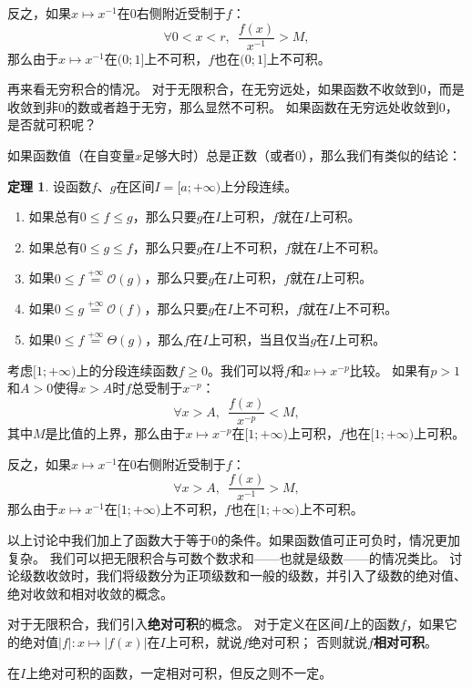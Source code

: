 \documentclass[12pt,UTF8]{ctexbook}
\newcommand{\oveq}[1]{\overset{#1}{=}}   %
\newcommand{\Olim}[1]{\mathcal{O}\left(#1\right)}  %
\newcommand{\Tlim}[1]{\mathcal{\Theta}\left(#1\right)}  %
\theoremstyle{definition}
\newtheorem{tm}{定理}[section]
\theoremstyle{plain}
\begin{document}
反之，如果$x\mapsto x^{-1}$在$0$右侧附近受制于$f$：
$$ \forall 0<x<r ,\,\,\,\frac{f(x)}{x^{-1}} > M,$$
那么由于$x\mapsto x^{-1}$在$(0;1]$上不可积，$f$也在$(0;1]$上不可积。

再来看无穷积合的情况。
对于无限积合，在无穷远处，如果函数不收敛到$0$，而是收敛到非$0$的数或者趋于无穷，那么显然不可积。
如果函数在无穷远处收敛到$0$，是否就可积呢？

如果函数值（在自变量$x$足够大时）总是正数（或者$0$），那么我们有类似的结论：
\begin{tm}
    设函数$f$、$g$在区间$I=[a;+\infty)$上分段连续。
    \begin{enumerate}
        \item 如果总有$0\leqslant f \leqslant g$，那么只要$g$在$I$上可积，$f$就在$I$上可积。
        \item 如果总有$0\leqslant g \leqslant f$，那么只要$g$在$I$上不可积，$f$就在$I$上不可积。
        \item 如果$0\leqslant f \oveq{+\infty} \Olim{g}$，那么只要$g$在$I$上可积，$f$就在$I$上可积。
        \item 如果$0\leqslant g \oveq{+\infty} \Olim{f}$，那么只要$g$在$I$上不可积，$f$就在$I$上不可积。
        \item 如果$0\leqslant f \oveq{+\infty} \Tlim{g}$，那么$f$在$I$上可积，当且仅当$g$在$I$上可积。
    \end{enumerate}
\end{tm}

考虑$[1;+\infty)$上的分段连续函数$f\geqslant 0$。我们可以将$f$和$x\mapsto x^{-p}$比较。
如果有$p>1$和$A>0$使得$x>A$时$f$总受制于$x^{-p}$：
$$ \forall x>A ,\,\,\,\frac{f(x)}{x^{-p}} < M,$$
其中$M$是比值的上界，那么由于$x\mapsto x^{-p}$在$[1;+\infty)$上可积，$f$也在$[1;+\infty)$上可积。

反之，如果$x\mapsto x^{-1}$在$0$右侧附近受制于$f$：
$$ \forall x>A ,\,\,\,\frac{f(x)}{x^{-1}} > M,$$
那么由于$x\mapsto x^{-1}$在$[1;+\infty)$上不可积，$f$也在$[1;+\infty)$上不可积。

以上讨论中我们加上了函数大于等于$0$的条件。如果函数值可正可负时，情况更加复杂。
我们可以把无限积合与可数个数求和——也就是级数——的情况类比。
讨论级数收敛时，我们将级数分为正项级数和一般的级数，并引入了级数的绝对值、绝对收敛和相对收敛的概念。

对于无限积合，我们引入\textbf{绝对可积}的概念。
对于定义在区间$I$上的函数$f$，如果它的绝对值$|f|: x\mapsto |f(x)|$在$I$上可积，就说$f$绝对可积；
否则就说$f$\textbf{相对可积}。

在$I$上绝对可积的函数，一定相对可积，但反之则不一定。
\end{document}
